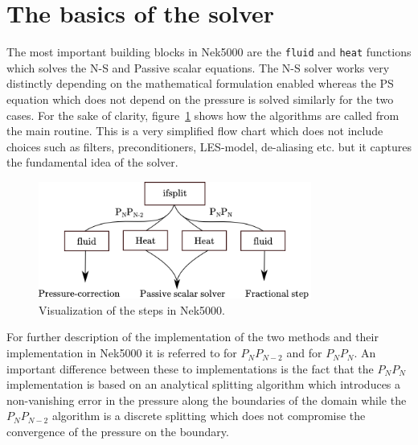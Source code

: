 \section{The basics of the solver}
The most important building blocks in Nek5000 are the \verb|fluid| and \verb|heat| functions which solves the 
N-S and Passive scalar equations. The N-S solver works very distinctly depending on the mathematical formulation
enabled whereas the PS equation which does not depend on the pressure is solved similarly for the two cases. 
For the sake of clarity, figure~\ref{fig:files} shows how the algorithms are called from the main routine.
This is a very simplified flow chart which does not include choices such as filters, preconditioners, LES-model, 
de-aliasing etc. but it captures the fundamental idea of the solver. 
%
\begin{figure}[h]
	\centering
	\includegraphics[width=0.8\textwidth]{Figures/Nek.png}
	\caption{Visualization of the steps in Nek5000.}
	\label{fig:files}
\end{figure}
%

For further description of the implementation of the two methods and their implementation in Nek5000 it is referred to \cite{Fischer_hybridschwarz-multigrid}
for $P_NP_{N-2}$ and \cite{TomboulidesPnPn} for $P_NP_N$. An important difference between these to implementations is the fact that the $P_NP_N$ 
implementation is based on an analytical splitting algorithm which introduces a non-vanishing error in the pressure along the boundaries of the 
domain while the $P_NP_{N-2}$ algorithm is a discrete splitting which does not compromise the convergence of the pressure on the boundary.


